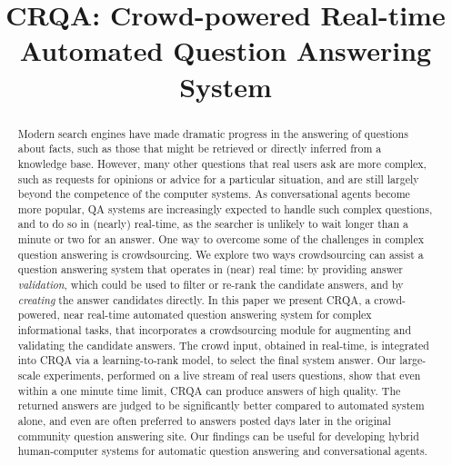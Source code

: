\documentclass[letterpaper]{article}
\begin{document}
%
\title{CRQA: Crowd-powered Real-time Automated Question Answering System}

\maketitle
\begin{abstract}
Modern search engines have made dramatic progress in the answering of questions about facts, such as those that might be retrieved or directly inferred from a knowledge base.
However, many other questions that real users ask are more complex, such as requests for opinions or advice for a particular situation, and are still largely beyond the competence of the computer systems.
As conversational agents become more popular, QA systems are increasingly expected to handle such complex questions, and to do so in (nearly) real-time, as the searcher is unlikely to wait longer than a minute or two for an answer.
One way to overcome some of the challenges in complex question answering is crowdsourcing.
We explore two ways crowdsourcing can assist a question answering system that operates in (near) real time: by providing answer {\em validation}, which could be used to filter or re-rank the candidate answers, and by {\em creating} the answer candidates directly.
In this paper we present CRQA, a crowd-powered, near real-time automated question answering system for complex informational tasks, that incorporates a crowdsourcing module for augmenting and validating the candidate answers.
The crowd input, obtained in real-time, is integrated into CRQA via a learning-to-rank model, to select the final system answer.
Our large-scale experiments, performed on a live stream of real users questions, show that even within a one minute time limit, CRQA can produce answers of high quality.
The returned answers are judged to be significantly better compared to automated system alone, and even are often preferred to answers posted days later in the original community question answering site.
Our findings can be useful for developing hybrid human-computer systems for automatic question answering and conversational agents.
\end{abstract}
\end{document}
